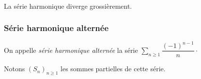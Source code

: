 \documentclass[french,11pt,twoside]{VcCours}
\newcommand{\dx}{\text{d}x}
\newcommand{\Sum}[2]{\ensuremath{\textstyle{\sum\limits_{#1}^{#2}}}}
\newcommand{\Int}[2]{\ensuremath{\mathchoice%
	{{\displaystyle\int_{#1}^{#2}}}
	{{\displaystyle\int_{#1}^{#2}}}
	{\int_{#1}^{#2}}
	{\int_{#1}^{#2}}
}}
\begin{document}
\begin{Remarque}{} La série harmonique diverge grossièrement.
\end{Remarque}

\subsubsection{Série harmonique alternée}

On appelle \emph{série harmonique alternée} la série $ \Sum{n \geq 1}{} \dfrac{(-1)^{n-1}}{n} \cdot$

\medskip

Notons $(S_n)_{n \geq 1}$ les sommes partielles de cette série.
\end{document}
